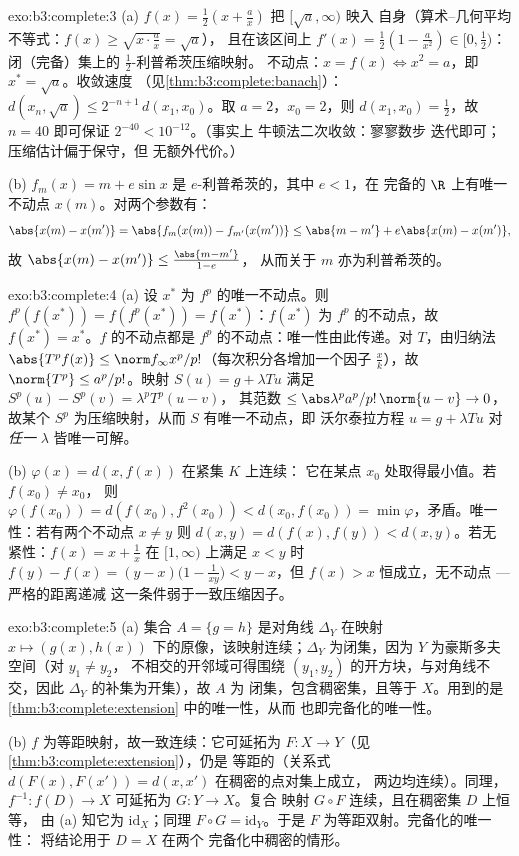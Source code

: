 \begin{solution}{exo:b3:complete:3}
(a) $f(x) = \frac12(x + \frac ax)$ 把 $[\sqrt a, \infty)$ 映入
自身（算术–几何平均不等式：$f(x) \geq \sqrt{x \cdot \frac ax} = \sqrt a$），
且在该区间上 $f'(x) = \frac12(1 - \frac a{x^2}) \in [0, \frac12)$：
闭（完备）集上的 $\frac12$-利普希茨压缩映射。
不动点：$x = f(x) \iff x^2 = a$，即 $x^* = \sqrt a$。收敛速度
（见\cref{thm:b3:complete:banach}）：$d(x_n, \sqrt a) \leq
2^{-n+1}\,d(x_1, x_0)$。取 $a = 2$，$x_0 = 2$，则 $d(x_1, x_0) =
\frac12$，故 $n = 40$ 即可保证 $2^{-40} < 10^{-12}$。（事实上
牛顿法二次收敛：寥寥数步
迭代即可；压缩估计偏于保守，但
无额外代价。）

(b) $f_m(x) = m + e\sin x$ 是 $e$-利普希茨的，其中 $e < 1$，在
完备的 $\R$ 上有唯一不动点 $x(m)$。对两个参数有：
\[
\abs{x(m) - x(m')} = \abs{f_m(x(m)) - f_{m'}(x(m'))}
\leq \abs{m - m'} + e\abs{x(m) - x(m')},
\]
故 $\abs{x(m) - x(m')} \leq \frac{\abs{m - m'}}{1 - e}$，
从而关于 $m$ 亦为利普希茨的。
\end{solution}

\begin{solution}{exo:b3:complete:4}
(a) 设 $x^*$ 为 $f^p$ 的唯一不动点。则
$f^p(f(x^*)) = f(f^p(x^*)) = f(x^*)$：$f(x^*)$ 为
$f^p$ 的不动点，故 $f(x^*) = x^*$。$f$ 的不动点都是
$f^p$ 的不动点：唯一性由此传递。对 $T$，由归纳法 $\abs{T^pf(x)}
\leq \norm f_\infty x^p/p!$（每次积分各增加一个因子
$\frac xk$），故 $\norm{T^p} \leq a^p/p!$。映射 $S(u) = g +
\lambda Tu$ 满足 $S^p(u) - S^p(v) = \lambda^pT^p(u - v)$，
其范数 $\leq \abs\lambda^pa^p/p!\,\norm{u - v} \to 0$，故某个
$S^p$ 为压缩映射，从而 $S$ 有唯一不动点，即
沃尔泰拉方程 $u = g + \lambda Tu$ 对
\emph{任一} $\lambda$ 皆唯一可解。

(b) $\varphi(x) = d(x, f(x))$ 在紧集 $K$ 上连续：
它在某点 $x_0$ 处取得最小值。若 $f(x_0) \neq x_0$，
则 $\varphi(f(x_0)) = d(f(x_0), f^2(x_0)) < d(x_0, f(x_0)) =
\min\varphi$，矛盾。唯一性：若有两个不动点 $x \ne y$
则 $d(x,y) = d(f(x), f(y)) < d(x,y)$。若无
紧性：$f(x) = x + \frac1x$ 在 $[1, \infty)$ 上满足
$x < y$ 时 $f(y) - f(x) = (y - x)\bigl(1 - \frac1{xy}\bigr) <
y - x$，但 $f(x) > x$ 恒成立，无不动点 --- 严格的距离递减
这一条件弱于一致压缩因子。
\end{solution}

\begin{solution}{exo:b3:complete:5}
(a) 集合 $A = \{g = h\}$ 是对角线
$\Delta_Y$ 在映射 $x \mapsto (g(x), h(x))$ 下的原像，该映射连续；$\Delta_Y$
为闭集，因为 $Y$ 为豪斯多夫空间（对 $y_1 \neq y_2$，
不相交的开邻域可得围绕 $(y_1,
y_2)$ 的开方块，与对角线不交，因此
$\Delta_Y$ 的补集为开集），故 $A$ 为
闭集，包含稠密集，且等于 $X$。用到的是
\cref{thm:b3:complete:extension} 中的唯一性，从而
也即完备化的唯一性。

(b) $f$ 为等距映射，故一致连续：它可延拓为
$F\colon X \to Y$（见\cref{thm:b3:complete:extension}），仍是
等距的（关系式 $d(F(x), F(x')) = d(x, x')$ 在稠密的点对集上成立，
两边均连续）。同理，
$f^{-1}\colon f(D) \to X$ 可延拓为 $G \colon Y \to X$。复合
映射 $G \circ F$ 连续，且在稠密集 $D$ 上恒等，
由 (a) 知它为 $\mathrm{id}_X$；同理 $F \circ G =
\mathrm{id}_Y$。于是 $F$ 为等距双射。完备化的唯一性：
将结论用于 $D = X$ 在两个
完备化中稠密的情形。
\end{solution}

